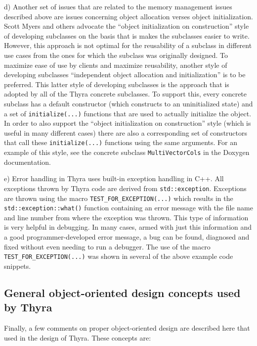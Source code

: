 \documentclass[pdf,ps2pdf,11pt]{SANDreport}
\begin{document}
d) Another set of issues that are related to the memory management
issues described above are issues concerning object allocation verses
object initialization.  Scott Myers {}\cite{ref:meyers_1996} and
others advocate the ``object initialization on construction'' style of
developing subclasses on the basis that is makes the subclasses easier
to write.  However, this approach is not optimal for the reusability
of a subclass in different use cases from the ones for which the
subclass was originally designed.  To maximize ease of use by clients
and maximize reusability, another style of developing subclasses
``independent object allocation and initialization'' is to be
preferred.  This latter style of developing subclasses is the approach
that is adopted by all of the Thyra concrete subclasses.  To support
this, every concrete subclass has a default constructor (which
constructs to an uninitialized state) and a set of
{}\texttt{initialize(...)}  functions that are used to actually
initialize the object.  In order to also support the ``object
initialization on construction'' style (which is useful in many
different cases) there are also a corresponding set of constructors
that call these {}\texttt{initialize(...)} functions using the same
arguments.  For an example of this style, see the concrete subclass
{}\texttt{MultiVectorCols} in the Doxygen documentation.

e) Error handling in Thyra uses built-in exception handling in C++.
All exceptions thrown by Thyra code are derived from
{}\texttt{std::exception}.  Exceptions are thrown using the macro
{}\texttt{TEST\-\_FOR\-\_EXCEPTION(...)} which results in the
{}\texttt{std::exception::what()} function containing an error message
with the file name and line number from where the exception was
thrown.  This type of information is very helpful in debugging.  In
many cases, armed with just this information and a good
programmer-developed error message, a bug can be found, diagnosed and
fixed without even needing to run a debugger.  The use of the macro
{}\texttt{TEST\-\_FOR\-\_EXCEPTION(...)} was shown in several of the
above example code snippets.

%
\subsection{General object-oriented design concepts used by Thyra}
\label{tsfcore:sec:good-oo-design}
%

Finally, a few comments on proper object-oriented design are described
here that used in the design of Thyra.  These concepts are:
\end{document}
